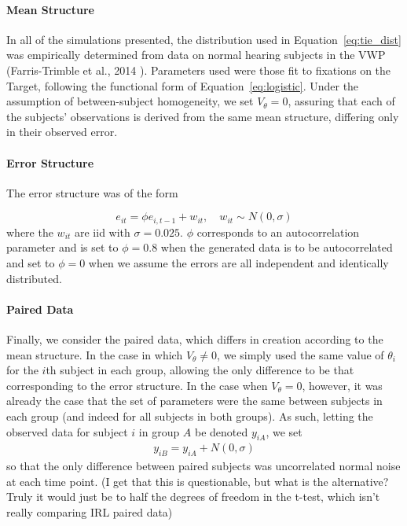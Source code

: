 \documentclass{article}
\begin{document}
\paragraph{Mean Structure} In all of the simulations presented, the distribution used in Equation~\ref{eq:tie_dist} was empirically determined from data on normal hearing subjects in the VWP (Farris-Trimble et  al., 2014 \cite{FarrisTrimble2014}). Parameters used were those fit to fixations on the Target, following the functional form of Equation~\ref{eq:logistic}. Under the assumption of between-subject homogeneity, we set $V_{\theta} = 0$, assuring that each of the subjects' observations is derived from the same mean structure, differing only in their observed error.


\paragraph{Error Structure} The error structure was of the form

\begin{equation}
e_{it} = \phi e_{i, t-1} + w_{it}, \quad w_{it} \sim N(0, \sigma)
\end{equation}
where the $w_{it}$ are iid with $\sigma = 0.025$. $\phi$ corresponds to an autocorrelation parameter and is set to $\phi = 0.8$ when the generated data is to be autocorrelated and set to $\phi = 0$ when we assume the errors are all independent and identically distributed. 

\paragraph{Paired Data} Finally, we consider the paired data, which differs in creation according to the mean structure. In the case in which $V_{\theta} \not= 0$, we simply used the same value of $\theta_i$ for the $i$th subject in each group, allowing the only difference to be that corresponding to the error structure. In the case when $V_{\theta} = 0$, however, it was already the case that the set of parameters were the same between subjects in each group (and indeed for all subjects in both groups). As such, letting the observed data for subject $i$ in group $A$ be denoted $y_{iA}$, we set
\begin{align*}
y_{iB} = y_{iA} + N(0, \sigma)
\end{align*}
so that the only difference between paired subjects was uncorrelated normal noise at each time point. (I get that this is questionable, but what is the alternative? Truly it would just be to half the degrees of freedom in the t-test, which isn't really comparing IRL paired data)
\end{document}
